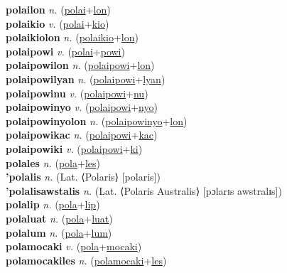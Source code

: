 \textbf{polailon} \textit{n.} (\hyperref[polai]{polai}+\hyperref[lon]{lon})
 \label{polailon} \\
\textbf{polaikio} \textit{v.} (\hyperref[polai]{polai}+\hyperref[kio]{kio})
 \label{polaikio} \\
\textbf{polaikiolon} \textit{n.} (\hyperref[polaikio]{polaikio}+\hyperref[lon]{lon})
 \label{polaikiolon} \\
\textbf{polaipowi} \textit{v.} (\hyperref[polai]{polai}+\hyperref[powi]{powi})
 \label{polaipowi} \\
\textbf{polaipowilon} \textit{n.} (\hyperref[polaipowi]{polaipowi}+\hyperref[lon]{lon})
 \label{polaipowilon} \\
\textbf{polaipowilyan} \textit{n.} (\hyperref[polaipowi]{polaipowi}+\hyperref[lyan]{lyan})
 \label{polaipowilyan} \\
\textbf{polaipowinu} \textit{v.} (\hyperref[polaipowi]{polaipowi}+\hyperref[nu]{nu})
 \label{polaipowinu} \\
\textbf{polaipowinyo} \textit{v.} (\hyperref[polaipowi]{polaipowi}+\hyperref[nyo]{nyo})
 \label{polaipowinyo} \\
\textbf{polaipowinyolon} \textit{n.} (\hyperref[polaipowinyo]{polaipowinyo}+\hyperref[lon]{lon})
 \label{polaipowinyolon} \\
\textbf{polaipowikac} \textit{n.} (\hyperref[polaipowi]{polaipowi}+\hyperref[kac]{kac})
 \label{polaipowikac} \\
\textbf{polaipowiki} \textit{v.} (\hyperref[polaipowi]{polaipowi}+\hyperref[ki]{ki})
 \label{polaipowiki} \\
\textbf{polales} \textit{n.} (\hyperref[pola]{pola}+\hyperref[les]{les})
 \label{polales} \\
\textbf{'polalis} \textit{n.} (Lat. ⟨Polaris⟩ [polaris])
 \label{'polalis} \\
\textbf{'polalisawstalis} \textit{n.} (Lat. ⟨Polaris Australis⟩ [pɔlarɪs awstralɪs])
 \label{'polalisawstalis} \\
\textbf{polalip} \textit{n.} (\hyperref[pola]{pola}+\hyperref[lip]{lip})
 \label{polalip} \\
\textbf{polaluat} \textit{n.} (\hyperref[pola]{pola}+\hyperref[luat]{luat})
 \label{polaluat} \\
\textbf{polalum} \textit{n.} (\hyperref[pola]{pola}+\hyperref[lum]{lum})
 \label{polalum} \\
\textbf{polamocaki} \textit{v.} (\hyperref[pola]{pola}+\hyperref[mocaki]{mocaki})
 \label{polamocaki} \\
\textbf{polamocakiles} \textit{n.} (\hyperref[polamocaki]{polamocaki}+\hyperref[les]{les})
